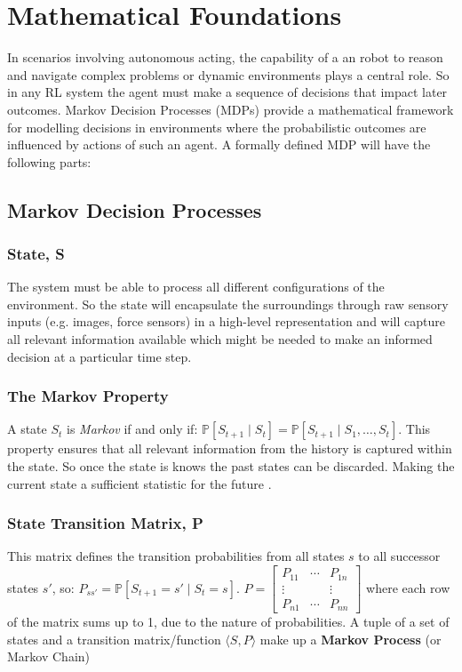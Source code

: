 \section{Mathematical Foundations}

  In scenarios involving autonomous acting, the capability of a an robot to reason and navigate complex problems or dynamic environments plays a central role. So in any RL system the agent must make a sequence of decisions that impact later outcomes. Markov Decision Processes (MDPs) provide a mathematical framework for modelling decisions in environments where the probabilistic outcomes are influenced by actions of such an agent. A formally defined MDP will have the following parts:

\subsection{Markov Decision Processes}\label{sec:mdp}
  \subsubsection{State, S}
    The system must be able to process all different configurations of the environment. So the state will encapsulate the surroundings through raw sensory inputs (e.g. images, force sensors) in a high-level representation and will capture all relevant information available \cite{Sutton1998} which might be needed to make an informed decision at a particular time step.

  \subsubsection{The Markov Property}
    A state $S_t$ is \emph{Markov} if and only if:
    \(
      \mathbb{P} \left[S_{t+1} \mid S_t\right] = \mathbb{P}\left[ S_{t+1} \mid S_1, \ldots, S_t\right]
    \). This property ensures that all relevant information from the history is captured within the state. So once the state is knows the past states can be discarded. Making the current state a sufficient statistic for the future \cite{silver2015}.

  \subsubsection{State Transition Matrix, P}
    This matrix defines the transition probabilities from all states $s$ to all successor states $s'$, so: \( P_{ss'} = \mathbb{P} \left[S_{t+1} = s'  \mid S_t = s\right]\). \( P =
    \begin{bmatrix}
      P_{11} & \cdots & P_{1n} \\ 
      \vdots & & \vdots\\
      P_{n1} & \cdots & P_{nn}
    \end{bmatrix}
    \) where each row of the matrix sums up to 1, due to the nature of probabilities. A tuple of a set of states and a transition matrix/function \(\langle S, P \rangle\) make up a \textbf{Markov Process} (or Markov Chain)

